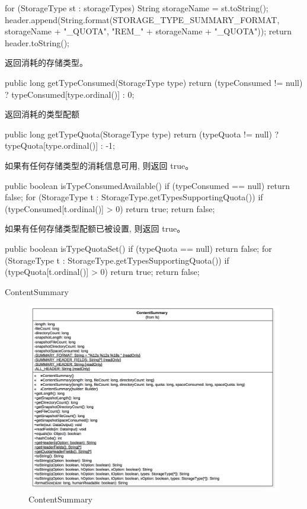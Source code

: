 \begin{java}
\begin{java}
{  for (StorageType st : storageTypes) {
    String storageName = st.toString();
    header.append(String.format(STORAGE_TYPE_SUMMARY_FORMAT,
        storageName + "_QUOTA", "REM_" + storageName + "_QUOTA"));
  }
  return header.toString();
}
\end{java}
返回消耗的存储类型。
\begin{java}
public long getTypeConsumed(StorageType type) {
  return (typeConsumed != null) ? typeConsumed[type.ordinal()] : 0;
}
\end{java}
返回消耗的类型配额
\begin{java}
public long getTypeQuota(StorageType type) {
  return (typeQuota != null) ? typeQuota[type.ordinal()] : -1;
}
\end{java}
如果有任何存储类型的消耗信息可用, 则返回 true。
\begin{java}
public boolean isTypeConsumedAvailable() {
  if (typeConsumed == null) {
    return false;
  }
  for (StorageType t : StorageType.getTypesSupportingQuota()) {
    if (typeConsumed[t.ordinal()] > 0) {
      return true;
    }
  }
  return false;
}
\end{java}
如果有任何存储类型配额已被设置, 则返回 true。
\begin{java}
public boolean isTypeQuotaSet() {
  if (typeQuota == null) {
    return false;
  }
  for (StorageType t : StorageType.getTypesSupportingQuota()) {
    if (typeQuota[t.ordinal()] > 0) {
      return true;
    }
  }
  return false;
}
\end{java}

ContentSummary

\begin{figure}[h]
\centering
\includegraphics[width =1\linewidth]{9.png}
\caption{ContentSummary}
\label{fig:ContentSummary}
\end{figure}


\end{java}
